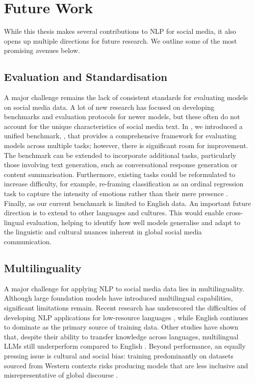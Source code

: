 \section{Future Work} \label{ch7:future-work}

While this thesis makes several contributions to \ac{NLP} for social media, it also opens up multiple directions for future research. We outline some of the most promising avenues below.

\subsection{Evaluation and Standardisation}
A major challenge remains the lack of consistent standards for evaluating models on social media data. A lot of new research \cite{song2023globalbench} has focused on developing benchmarks and evaluation protocols for newer models, but these often do not account for the unique characteristics of social media text. In , we introduced a unified benchmark, {\DATASET}, that provides a comprehensive framework for evaluating models across multiple tasks; however, there is significant room for improvement. The benchmark can be extended to incorporate additional tasks, particularly those involving text generation, such as conversational response generation or content summarisation. Furthermore, existing tasks could be reformulated to increase difficulty, for example, re-framing classification as an ordinal regression task to capture the intensity of emotions rather than their mere presence \cite{muhammad-etal-2025-brighter}. Finally, as our current benchmark is limited to English data. An important future direction is to extend {\DATASET} to other languages and cultures. This would enable cross-lingual evaluation, helping to identify how well models generalise and adapt to the linguistic and cultural nuances inherent in global social media communication.




\subsection{Multilinguality}
A major challenge for applying \ac{NLP} to social media data lies in multilinguality. Although large foundation models have introduced multilingual capabilities, significant limitations remain. Recent research has underscored the difficulties of developing \ac{NLP} applications for low-resource languages \citep{aji2022one}, while English continues to dominate as the primary source of training data. Other studies have shown that, despite their ability to transfer knowledge across languages, multilingual \acp{LLM} still underperform compared to English \citep{zhang-etal-2023-dont}. Beyond performance, an equally pressing issue is cultural and social bias: training predominantly on datasets sourced from Western contexts risks producing models that are less inclusive and misrepresentative of global discourse \citep{ahmadian2024multilingual}.

